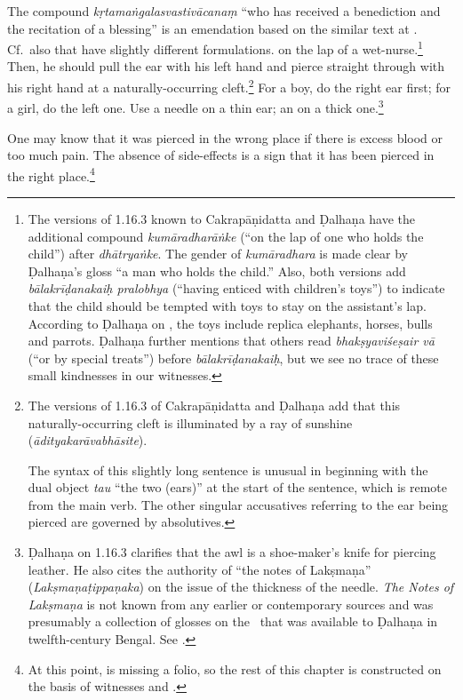 \begin{translation}
{The compound \emph{kṛtamaṅgalasvastivācanaṃ} “who has received a benediction and
the recitation of a blessing” is an emendation based on the similar text at
.  Cf.\ also  that have slightly
different formulations.} on the lap of a wet-nurse.\footnote{The versions of
    1.16.3 known to Cakrapāṇidatta \citep[126]{acar-1939} and Ḍalhaṇa
    \citep[76]{vulgate} have the additional compound \emph{kumāradharāṅke} (“on the
    lap of one who holds the child”) after \emph{dhātryaṅke}. The gender of
    \emph{kumāradhara} is made clear by  Ḍalhaṇa's gloss “a man who holds the child.”
    Also, both versions add \emph{bālakrīḍanakaiḥ pralobhya} (“having enticed with
    children's toys”) to indicate that the child should be tempted with toys to stay
    on the assistant's lap. According to Ḍalhaṇa on , the toys include
    replica elephants, horses, bulls and parrots. Ḍalhaṇa further mentions that others
    read \emph{bhakṣyaviśeṣair vā} (“or by special treats”) before
    \emph{bālakrīḍanakaiḥ}, but we see no trace of these small kindnesses in our
    witnesses.} Then, he should pull the ear with his left hand 
    and pierce straight through with his right hand at a naturally-occurring
    cleft.\footnote{The versions of 1.16.3 of Cakrapāṇidatta \citep[126]{acar-1939}
        and Ḍalhaṇa \citep[76]{vulgate} add that this naturally-occurring cleft is
        illuminated by a ray of sunshine  (\emph{ādityakarāvabhāsite}).

The syntax of this slightly long sentence is unusual in beginning with the dual
object \emph{tau} “the two (ears)” at the start of the sentence, which is remote
from the main verb.  The other singular accusatives referring to the ear being
pierced are governed by absolutives.} For a boy, do the right ear first; for a
girl, do the left one. Use a needle on a thin ear; an  on a thick
one.\footnote{Ḍalhaṇa on 1.16.3 \citep[76]{vulgate} clarifies that the awl is a
    shoe-maker's knife for piercing leather.  He also cites the authority of “the
    notes of Lakṣmaṇa” (\emph{Lakṣmaṇaṭippaṇaka}) on the issue of the thickness of the
    needle. \textit{The Notes of Lakṣmaṇa} is not known from any earlier or
    contemporary sources and was presumably a collection of glosses on the \SS\ that
    was available to Ḍalhaṇa in twelfth-century Bengal. See \citet[IA,
    386]{meul-hist}.}
    
    
\item [3]  
    
One may know that it was pierced in the wrong place if there is excess blood or
too much pain. The absence of side-effects is a sign that it has been pierced in the right
place.\footnote{At this point,  is missing a folio, so
    the rest of this chapter is constructed on the basis of witnesses
     and .}
    

\end{translation}
